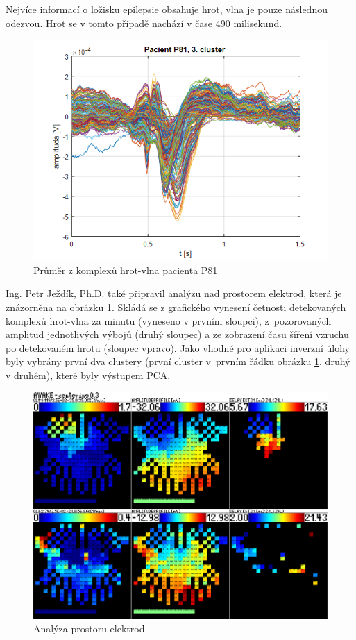 Nejvíce informací o ložisku epilepsie obsahuje hrot, vlna je pouze následnou odezvou. Hrot se v tomto případě nachází v čase 490 milisekund.
\begin{figure}[!h]
\includegraphics[width=1.0\textwidth]{casti/aplikace/epilepsie/prubehy.png}
\caption{Průměr z komplexů hrot-vlna pacienta P81}
\end{figure}

Ing. Petr Ježdík, Ph.D. také připravil analýzu nad prostorem elektrod, která je znázorněna na obrázku \ref{analyzaElektrod}. Skládá se z grafického vynesení četnosti detekovaných komplexů hrot-vlna za minutu (vyneseno v prvním sloupci), z~pozorovaných amplitud jednotlivých výbojů (druhý sloupec) a ze zobrazení času šíření vzruchu po detekovaném hrotu (sloupec vpravo). Jako vhodné pro aplikaci inverzní úlohy byly vybrány první dva clustery (první cluster v~prvním řádku obrázku \ref{analyzaElektrod}, druhý v druhém), které byly výstupem PCA.
\begin{figure}[!h]
\includegraphics[width=1.0\textwidth]{casti/aplikace/epilepsie/analyza.png}
\caption{Analýza prostoru elektrod}
\label{analyzaElektrod}
\end{figure}


